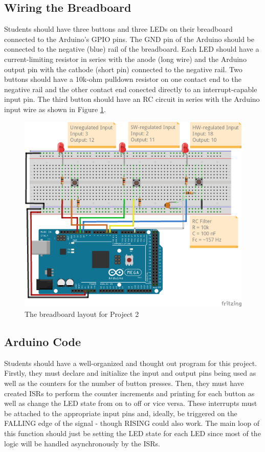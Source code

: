 \documentclass{article}
\begin{document}
    \subsection*{Wiring the Breadboard}
    Students should have three buttons and three LEDs on their breadboard connected to the Arduino's GPIO pins.
    The GND pin of the Arduino should be connected to the negative (blue) rail of the breadboard.
    Each LED should have a current-limiting resistor in series with the anode (long wire) and the Arduino output pin with the cathode (short pin) connected to  the negative rail.
    Two buttons should have a 10k-ohm pulldown resistor on one contact end to the negative rail and the other contact end conected directly to an interrupt-capable input pin.
    The third button should have an RC circuit in series with the Arduino input wire as shown in Figure \ref{fig:p2_digital_inputs_bb}. 

    \begin{figure}
        \centering
        \includegraphics[]{p2_digital_inputs_bb.png}
        \caption{The breadboard layout for Project 2}
        \label{fig:p2_digital_inputs_bb}
    \end{figure}

    \subsection*{Arduino Code}
    Students should have a well-organized and thought out program for this project.
    Firstly, they must declare and initialize the input and output pins being used as well as the counters for the number of button presses.
    Then, they must have created ISRs to perform the counter increments and printing for each button as well as change the LED state from on to off or vice versa.
    These interrupts must be attached to the appropriate input pins and, ideally, be triggered on the FALLING edge of the signal - though RISING could also work.
    The main loop of this function should just be setting the LED state for each LED since most of the logic will be handled asynchronously by the ISRs.
\end{document}
